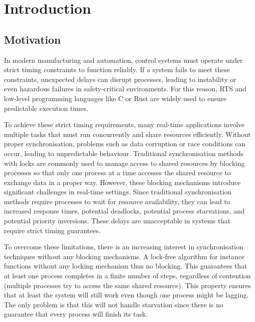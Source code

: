 \chapter{Introduction}\label{ch:introduction}

\section{Motivation}\label{sec:motivation}

In modern manufacturing and automation, control systems must operate under strict timing constraints to function reliably. If a system fails to meet these constraints, unexpected delays can disrupt processes, leading to instability or even hazardous failures in safety-critical environments. For this reason, \ac{RTS} and low-level programming languages like C or Rust are widely used to ensure predictable execution times.

To achieve these strict timing requirements, many real-time applications involve multiple tasks that must run concurrently and share resources efficiently. Without proper synchronisation, problems such as data corruption or race conditions can occur, leading to unpredictable behaviour. Traditional synchronisation methods with locks are commonly used to manage access to shared resources by blocking processes so that only one process at a time accesses the shared resource to exchange data in a proper way. However, these blocking mechanisms introduce significant challenges in real-time settings. Since traditional synchronisation methods require processes to wait for resource availability, they can lead to increased response times, potential deadlocks, potential process starvations, and potential priority inversions. These delays are unacceptable in systems that require strict timing guarantees. \cite{herlihy1991wait, brandenburg2019multiprocessorrealtimelockingprotocols, kode2024analysisSynchronization}

To overcome these limitations, there is an increasing interest in synchronisation techniques without any blocking mechanisms. A lock-free algorithm for instance functions without any locking mechanism thus no blocking. This guarantees that at least one process completes in a finite number of steps, regardless of contention (multiple processes try to access the same shared resource). This property ensures that at least the system will still work even though one process might be lagging. The only problem is that this will not handle starvation since there is no guarantee that every process will finish its task. \cite{kogan2012methodology}

